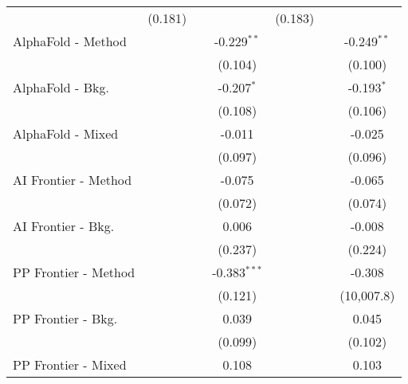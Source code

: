 \begin{tabular}{lcccccc}
                                  & (0.181)       &               &                & (0.183)        &                &   \\   
   AlphaFold - Method             &               &               & -0.229$^{**}$  &                &                & -0.249$^{**}$\\   
                                  &               &               & (0.104)        &                &                & (0.100)\\   
   AlphaFold - Bkg.               &               &               & -0.207$^{*}$   &                &                & -0.193$^{*}$\\   
                                  &               &               & (0.108)        &                &                & (0.106)\\   
   AlphaFold - Mixed              &               &               & -0.011         &                &                & -0.025\\   
                                  &               &               & (0.097)        &                &                & (0.096)\\   
   AI Frontier - Method           &               &               & -0.075         &                &                & -0.065\\   
                                  &               &               & (0.072)        &                &                & (0.074)\\   
   AI Frontier - Bkg.             &               &               & 0.006          &                &                & -0.008\\   
                                  &               &               & (0.237)        &                &                & (0.224)\\   
   PP Frontier - Method           &               &               & -0.383$^{***}$ &                &                & -0.308\\   
                                  &               &               & (0.121)        &                &                & (10,007.8)\\   
   PP Frontier - Bkg.             &               &               & 0.039          &                &                & 0.045\\   
                                  &               &               & (0.099)        &                &                & (0.102)\\   
   PP Frontier - Mixed            &               &               & 0.108          &                &                & 0.103\\   

\end{tabular}
